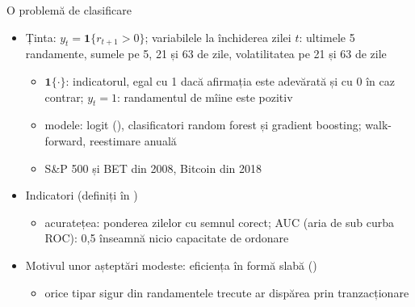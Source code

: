 \begin{frame}{O problemă de clasificare}
\itemsize{\small}
\begin{itemize}
    \item Ținta: $y_t = \mathbf{1}\{r_{t+1} > 0\}$; variabilele la închiderea zilei $t$: ultimele 5 randamente, sumele pe 5, 21 și 63 de zile, volatilitatea pe 21 și 63 de zile
    \begin{itemize}
        \item $\mathbf{1}\{\cdot\}$: indicatorul, egal cu 1 dacă afirmația este adevărată și cu 0 în caz contrar; $y_t = 1$: randamentul de mîine este pozitiv
        \item modele: logit (), clasificatori random forest și gradient boosting; walk-forward, reestimare anuală
        \item S\&P 500 și BET din 2008, Bitcoin din 2018
    \end{itemize}
    \item Indicatori (definiți în )
    \begin{itemize}
        \item acuratețea: ponderea zilelor cu semnul corect; AUC (aria de sub curba ROC): 0,5 înseamnă nicio capacitate de ordonare
    \end{itemize}
    \item Motivul unor așteptări modeste: eficiența în formă slabă ()
    \begin{itemize}
        \item orice tipar sigur din randamentele trecute ar dispărea prin tranzacționare
    \end{itemize}
\end{itemize}
\end{frame}

